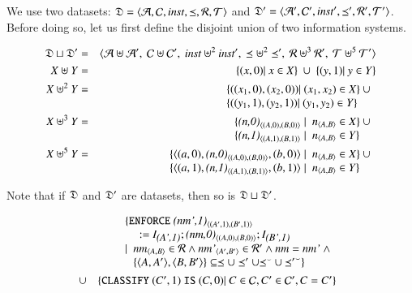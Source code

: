 \documentclass{elsarticle}
\begin{document}
	We use two datasets: $\mathfrak{D}=\langle\mathcal{A},\mathcal{C},\text{\it inst\/},\preceq,\mathcal{R},\mathcal{T}\rangle$ and $\mathfrak{D}'=\langle\mathcal{A}',\mathcal{C}',\text{\it inst\/}',\preceq',\mathcal{R}',\mathcal{T}'\rangle$.
	Before doing so, let us first define the disjoint union of two information systems.
\begin{definition}
	\begin{eqnarray}
		\dataset\sqcup\dataset'&=&\la\atoms\uplus\atoms',\ \concepts\uplus\concepts',\ \inst\uplus^2\inst',\ \isa\uplus^2\isa',\ \rels\uplus^3\rels',\ \triples\uplus^5\triples'\ra\\
		X\uplus Y&=&\{(x,0)|\ x\in X\}\ \cup\ \{(y,1)|\ y\in Y\}\\
		X\uplus^2 Y&=&\begin{array}[t]{@{}l}\{((x_1,0),(x_2,0))|\ (x_1,x_2)\in X\}\ \cup\\ \{((y_1,1),(y_2,1))|\ (y_1,y_2)\in Y\}\end{array}\\
		X\uplus^3 Y&=&\begin{array}[t]{@{}l}\{\declare{(n,0)}{(A,0)}{(B,0)}\mid\ \declare{n}{A}{B}\in X\}\ \cup\\ \{\declare{(n,1)}{(A,1)}{(B,1)}\mid\ \declare{n}{A}{B}\in Y\}\end{array}\\
		X\uplus^5 Y&=&\begin{array}[t]{@{}l}\{\triple{(a,0)}{\declare{(n,0)}{(A,0)}{(B,0)}}{(b,0)}\mid\ \declare{n}{A}{B}\in X\}\ \cup\\ \{\triple{(a,1)}{\declare{(n,1)}{(A,1)}{(B,1)}}{(b,1)}\mid\ \declare{n}{A}{B}\in Y\}\end{array}
	\end{eqnarray}
\end{definition}
Note that if $\mathfrak{D}$ and $\mathfrak{D}'$ are datasets, then so is $\mathfrak{D}\sqcup\mathfrak{D}'$.

\begin{definition}
	\begin{eqnarray}
		&&\begin{array}[t]{@{}l}
			\{ {\tt ENFORCE\ }\declare{(nm',1)}{(A',1)}{(B',1)}\\\quad{\tt\ :=\ }\ident{(A',1)};\declare{(nm,0)}{(A,0)}{(B,0)};\ident{(B',1)}\\
				\mid\ \begin{array}[t]{@{}l}
					\declare{nm}{A}{B}\in\rels\wedge\declare{nm'}{A'}{B'}\in\rels'\wedge\id{nm}=\id{nm'}\ \wedge\\
					\{\pair{A}{A'},\pair{B}{B'}\}\subseteq\isa\cup\isa'\cup\flip{\isa}\cup\flip{\isa'}\}
				   \end{array}
			  \end{array}\\
			  &\cup&\begin{array}[t]{@{}l}
				\{ {\tt CLASSIFY\ }(C',1){\tt\ IS\ }(C,0)|\ C\in\concepts,C'\in\concepts',C=C'\}\\
			  \end{array}
	\end{eqnarray}
\end{definition}
\end{document}
